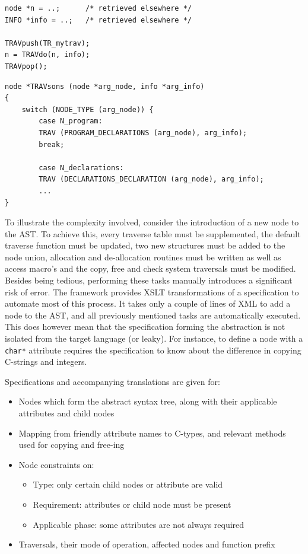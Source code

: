 \documentclass[twoside,openright]{uva-bachelor-thesis}
\newcommand{\code}[1]{\texttt{\footnotesize#1}}
\begin{document}
			\begin{lstlisting}[caption=Starting a traversal,label=old-arch:start-trav]
node *n = ..;      /* retrieved elsewhere */
INFO *info = ..;   /* retrieved elsewhere */

TRAVpush(TR_mytrav);
n = TRAVdo(n, info);
TRAVpop();
			\end{lstlisting}
			\begin{lstlisting}[caption=Excerpt from catch-all switch construct,label=old-arch:switch-trav]
node *TRAVsons (node *arg_node, info *arg_info)
{
	switch (NODE_TYPE (arg_node)) {
		case N_program:
		TRAV (PROGRAM_DECLARATIONS (arg_node), arg_info);
		break;
		
		case N_declarations:
		TRAV (DECLARATIONS_DECLARATION (arg_node), arg_info);
		...
}
			\end{lstlisting}
						
			To illustrate the complexity involved, consider the introduction of a new node to the AST. To achieve this, every traverse table must be supplemented, the default traverse function must be updated, two new structures must be added to the node union, allocation and de-allocation routines must be written as well as access macro's and the copy, free and check system traversals must be modified. Besides being tedious, performing these tasks manually introduces a significant risk of error. The framework provides XSLT transformations of a specification to automate most of this process. It takes only a couple of lines of XML to add a node to the AST, and all previously mentioned tasks are automatically executed. This does however mean that the specification forming the abstraction is not isolated from the target language (or leaky). For instance, to define a node with a \code{char*} attribute requires the specification to know about the difference in copying C-strings and integers.
					
			Specifications and accompanying translations are given for:
			\begin{itemize}
				\item Nodes which form the abstract syntax tree, along with their applicable attributes and child nodes
				\item Mapping from friendly attribute names to C-types, and relevant methods used for copying and free-ing
				\item Node constraints on:
				\begin{itemize}
					\item Type: only certain child nodes or attribute are valid
					\item Requirement: attributes or child node must be present
					\item Applicable phase: some attributes are not always required
				\end{itemize}
				\item Traversals, their mode of operation, affected nodes and function prefix
			\end{itemize}
		
\end{document}
